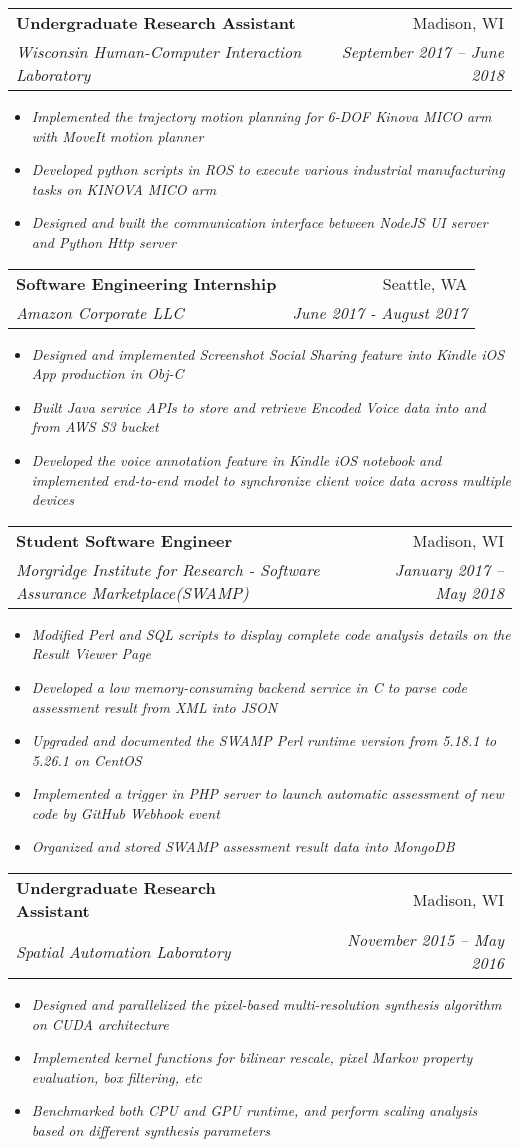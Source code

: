 \documentclass[a4paper,11pt]{article}
\makeatletter
\newcommand{\experienceItemStart}{\begin{itemize}}
\newcommand{\experienceItemEnd}{\end{itemize}\vspace{-5pt}}
\newcommand{\experienceItem}[1]{
  \item\small{
    \textit{#1 \vspace{-3pt}}
  }
}
\newcommand{\experienceHeader}[4]{
  \vspace{-1pt}\item
    \begin{tabular*}{0.97\textwidth}{l@{\extracolsep{\fill}}r}
      \textbf{#1} & #2 \\
      \textit{\small#3} & \textit{\small #4} \\
    \end{tabular*}\vspace{-5pt}
}
\makeatother
\begin{document}
		\experienceHeader
		{Undergraduate Research Assistant}{Madison, WI}
		{Wisconsin Human-Computer Interaction Laboratory}{September 2017 – June 2018}
			\experienceItemStart			
				\experienceItem
				{Implemented the trajectory motion planning for  6-DOF Kinova MICO arm with MoveIt motion planner}
				\experienceItem
				{Developed python scripts in ROS to execute various industrial manufacturing tasks on KINOVA MICO arm}
				\experienceItem
				{Designed and built the communication interface between NodeJS UI server and Python Http server}
			\experienceItemEnd
		
		\experienceHeader
		{Software Engineering Internship}{Seattle, WA}
		{Amazon Corporate LLC}{June 2017 - August 2017}
			\experienceItemStart	
				\experienceItem
				{Designed and implemented Screenshot Social Sharing feature into Kindle iOS App production in Obj-C}		
				\experienceItem
				{Built Java service APIs to store and retrieve Encoded Voice data into and from AWS S3 bucket}
				\experienceItem
				{Developed the voice annotation feature in Kindle iOS notebook and implemented end-to-end model to synchronize client voice data across multiple devices}
			\experienceItemEnd
		
		\experienceHeader
		{Student Software Engineer}{Madison, WI}
		{Morgridge Institute for Research - Software Assurance Marketplace(SWAMP)}{January 2017 – May 2018}	
			\experienceItemStart	
				\experienceItem
				{Modified Perl and SQL scripts to display complete code analysis details on the Result Viewer Page}
				\experienceItem
				{Developed a low memory-consuming backend service in C to parse code assessment result from XML into JSON}
				\experienceItem
				{Upgraded and documented the SWAMP Perl runtime version from 5.18.1 to 5.26.1 on CentOS}	
				\experienceItem
				{Implemented a trigger in PHP server to launch automatic assessment of new code by GitHub Webhook event}		
				\experienceItem
				{Organized and stored SWAMP assessment result data into MongoDB}		
			\experienceItemEnd

		\experienceHeader
		{Undergraduate Research Assistant}{Madison, WI}
		{Spatial Automation Laboratory}{November 2015 – May 2016}
			\experienceItemStart			
				\experienceItem
				{Designed and parallelized the pixel-based multi-resolution synthesis algorithm on CUDA architecture}
				\experienceItem
				{Implemented kernel functions for bilinear rescale, pixel Markov property evaluation, box filtering, etc}
				\experienceItem
				{Benchmarked both CPU and GPU runtime, and perform scaling analysis based on different synthesis parameters}
			\experienceItemEnd
\end{document}
